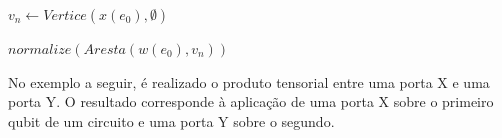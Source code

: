 \begin{algorithm}[H]
  \caption{Produto Tensorial Entre Arestas}
  \label{alg:kronecker}
  

  $v_n \gets Vertice(x(e_0), \emptyset)$ \;

  \Return $normalize(Aresta(w(e_0), v_n))$
\end{algorithm}

No exemplo a seguir, é realizado o produto tensorial entre uma porta X e uma porta Y. O resultado corresponde à aplicação de uma porta X sobre o primeiro qubit de um circuito e uma porta Y sobre o segundo.

